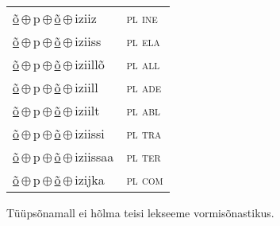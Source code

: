 \begin{minipage}{\textwidth}
\begin{sideways}
\begin{tabular}{l l}
\underline{õ}\,$\oplus$\,p\,$\oplus$\,\underline{õ}\,$\oplus$\,iziiz & \textsc{ pl ine } \\
\underline{õ}\,$\oplus$\,p\,$\oplus$\,\underline{õ}\,$\oplus$\,iziiss & \textsc{ pl ela } \\
\underline{õ}\,$\oplus$\,p\,$\oplus$\,\underline{õ}\,$\oplus$\,iziillõ & \textsc{ pl all } \\
\underline{õ}\,$\oplus$\,p\,$\oplus$\,\underline{õ}\,$\oplus$\,iziill & \textsc{ pl ade } \\
\underline{õ}\,$\oplus$\,p\,$\oplus$\,\underline{õ}\,$\oplus$\,iziilt & \textsc{ pl abl } \\
\underline{õ}\,$\oplus$\,p\,$\oplus$\,\underline{õ}\,$\oplus$\,iziissi & \textsc{ pl tra } \\
\underline{õ}\,$\oplus$\,p\,$\oplus$\,\underline{õ}\,$\oplus$\,iziissaa & \textsc{ pl ter } \\
\underline{õ}\,$\oplus$\,p\,$\oplus$\,\underline{õ}\,$\oplus$\,izijka & \textsc{ pl com } \\
\end{tabular}
\end{sideways}
\label{tab:tüüpsõnamall-õpõin}

\end{minipage}

 
\vspace{1em}
\noindent Tüüpsõnamall  ei hõlma teisi lekseeme vormi\-sõnastikus.
